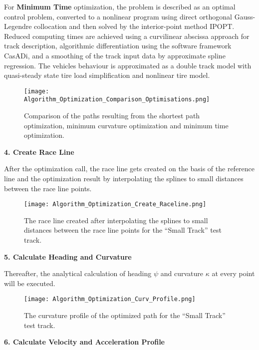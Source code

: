 For \textbf{Minimum Time} optimization, the problem is described as an optimal control problem, converted to a nonlinear program using direct orthogonal Gauss-Legendre collocation and then solved by the interior-point method IPOPT. Reduced computing
times are achieved using a curvilinear abscissa approach for track description, algorithmic differentiation using the software framework CasADi, and a smoothing of the track input data by approximate spline regression. The vehicles behaviour is approximated as a double track model with quasi-steady state tire load simplification and nonlinear tire model. \cite{minimum_time_trajectory_planning} \cite{powertrain_behaviour}

\begin{figure}[H]
    \centering
    \texttt{[image: Algorithm\_Optimization\_Comparison\_Optimisations.png]}
    \caption{Comparison of the paths resulting from the shortest path optimization, minimum curvature optimization and minimum time optimization. \cite{minimum_curvature_trajectory_planning}}
    \label{fig:Optimization Algorithm Comparing Different Optimisations}
\end{figure}

\textbf{4. Create Race Line}

After the optimization call, the race line gets created on the basis of the reference line and the optimization result by interpolating the splines to small distances between the race line points.
\begin{figure}[H]
    \centering
    \texttt{[image: Algorithm\_Optimization\_Create\_Raceline.png]}
    \caption{The race line created after interpolating the splines to small distances between the race line points for the ``Small Track'' test track.}
    \label{fig:Optimization Algorithm Created Race Line}
\end{figure}

\textbf{5. Calculate Heading and Curvature}

Thereafter, the analytical calculation of heading $\psi$ and curvature $\kappa$ at every point will be executed.
\begin{figure}[H]
    \centering
    \texttt{[image: Algorithm\_Optimization\_Curv\_Profile.png]}
    \caption{The curvature profile of the optimized path for the ``Small Track'' test track.}
    \label{fig:Optimization Algorithm Curvature Profile}
\end{figure}

\textbf{6. Calculate Velocity and Acceleration Profile}

